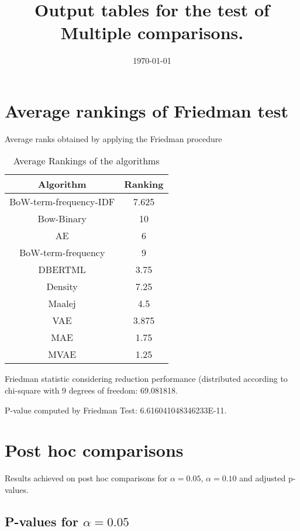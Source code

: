 \documentclass[a4paper,10pt]{article}
\title{Output tables for the test of Multiple comparisons.}
\author{}
\date{\today}
\begin{document}
\begin{landscape}
\pagestyle{empty}
\maketitle
\thispagestyle{empty}
\section{Average rankings of Friedman test}



Average ranks obtained by applying the Friedman procedure

\begin{table}[!htp]
\centering
\begin{tabular}{|c|c|}\hline
Algorithm&Ranking\\\hline
BoW-term-frequency-IDF & 7.625\\
Bow-Binary & 10\\
AE & 6\\
BoW-term-frequency & 9\\
DBERTML & 3.75\\
Density & 7.25\\
Maalej & 4.5\\
VAE & 3.875\\
MAE & 1.75\\
MVAE & 1.25\\
\hline
\end{tabular}
\caption{Average Rankings of the algorithms}
\end{table}

Friedman statistic considering reduction performance (distributed according to chi-square with 9 degrees of freedom: 69.081818.

P-value computed by Friedman Test: 6.616041048346233E-11.\newline



\pagebreak

\section{Post hoc comparisons}

Results achieved on post hoc comparisons for $\alpha = 0.05$, $\alpha = 0.10$ and adjusted p-values.

\subsection{P-values for $\alpha=0.05$}


\end{landscape}
\end{document}
